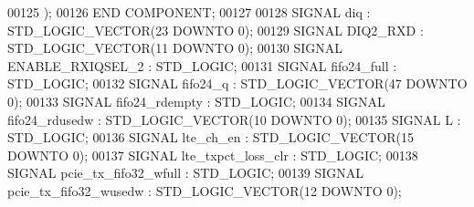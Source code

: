 \begin{DoxyCode}
00125     );
00126 \textcolor{keywordflow}{END} \textcolor{keywordflow}{COMPONENT};
00127 
00128 \textcolor{keywordflow}{SIGNAL}  \textcolor{vhdlchar}{diq} \textcolor{vhdlchar}{:}  \textcolor{comment}{STD\_LOGIC\_VECTOR}\textcolor{vhdlchar}{(}\textcolor{vhdllogic}{}\textcolor{vhdllogic}{23} \textcolor{keywordflow}{DOWNTO} \textcolor{vhdllogic}{}\textcolor{vhdllogic}{0}\textcolor{vhdlchar}{)};
00129 \textcolor{keywordflow}{SIGNAL}  \textcolor{vhdlchar}{DIQ2_RXD} \textcolor{vhdlchar}{:}  \textcolor{comment}{STD\_LOGIC\_VECTOR}\textcolor{vhdlchar}{(}\textcolor{vhdllogic}{}\textcolor{vhdllogic}{11} \textcolor{keywordflow}{DOWNTO} \textcolor{vhdllogic}{}\textcolor{vhdllogic}{0}\textcolor{vhdlchar}{)};
00130 \textcolor{keywordflow}{SIGNAL}  \textcolor{vhdlchar}{ENABLE_RXIQSEL_2} \textcolor{vhdlchar}{:}  \textcolor{comment}{STD\_LOGIC};
00131 \textcolor{keywordflow}{SIGNAL}  \textcolor{vhdlchar}{fifo24_full} \textcolor{vhdlchar}{:}  \textcolor{comment}{STD\_LOGIC};
00132 \textcolor{keywordflow}{SIGNAL}  \textcolor{vhdlchar}{fifo24_q} \textcolor{vhdlchar}{:}  \textcolor{comment}{STD\_LOGIC\_VECTOR}\textcolor{vhdlchar}{(}\textcolor{vhdllogic}{}\textcolor{vhdllogic}{47} \textcolor{keywordflow}{DOWNTO} \textcolor{vhdllogic}{}\textcolor{vhdllogic}{0}\textcolor{vhdlchar}{)};
00133 \textcolor{keywordflow}{SIGNAL}  \textcolor{vhdlchar}{fifo24_rdempty} \textcolor{vhdlchar}{:}  \textcolor{comment}{STD\_LOGIC};
00134 \textcolor{keywordflow}{SIGNAL}  \textcolor{vhdlchar}{fifo24_rdusedw} \textcolor{vhdlchar}{:}  \textcolor{comment}{STD\_LOGIC\_VECTOR}\textcolor{vhdlchar}{(}\textcolor{vhdllogic}{}\textcolor{vhdllogic}{10} \textcolor{keywordflow}{DOWNTO} \textcolor{vhdllogic}{}\textcolor{vhdllogic}{0}\textcolor{vhdlchar}{)};
00135 \textcolor{keywordflow}{SIGNAL}  \textcolor{vhdlchar}{L} \textcolor{vhdlchar}{:}  \textcolor{comment}{STD\_LOGIC};
00136 \textcolor{keywordflow}{SIGNAL}  \textcolor{vhdlchar}{lte_ch_en} \textcolor{vhdlchar}{:}  \textcolor{comment}{STD\_LOGIC\_VECTOR}\textcolor{vhdlchar}{(}\textcolor{vhdllogic}{}\textcolor{vhdllogic}{15} \textcolor{keywordflow}{DOWNTO} \textcolor{vhdllogic}{}\textcolor{vhdllogic}{0}\textcolor{vhdlchar}{)};
00137 \textcolor{keywordflow}{SIGNAL}  \textcolor{vhdlchar}{lte_txpct_loss_clr} \textcolor{vhdlchar}{:}  \textcolor{comment}{STD\_LOGIC};
00138 \textcolor{keywordflow}{SIGNAL}  \textcolor{vhdlchar}{pcie_tx_fifo32_wfull} \textcolor{vhdlchar}{:}  \textcolor{comment}{STD\_LOGIC};
00139 \textcolor{keywordflow}{SIGNAL}  \textcolor{vhdlchar}{pcie_tx_fifo32_wusedw} \textcolor{vhdlchar}{:}  \textcolor{comment}{STD\_LOGIC\_VECTOR}\textcolor{vhdlchar}{(}\textcolor{vhdllogic}{}\textcolor{vhdllogic}{12} \textcolor{keywordflow}{DOWNTO} \textcolor{vhdllogic}{}\textcolor{vhdllogic}{0}\textcolor{vhdlchar}{)};

\end{DoxyCode}
